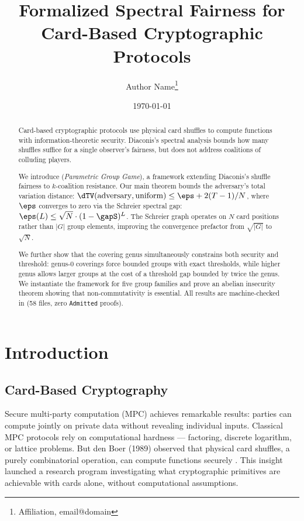 \documentclass[11pt,a4paper]{article}
\title{Formalized Spectral Fairness for Card-Based Cryptographic Protocols}
\author{
  Author Name\footnote{Affiliation, email@domain}
}
\date{\today}
\begin{document}
\maketitle

\begin{abstract}

Card-based cryptographic protocols use physical card shuffles to compute functions with information-theoretic security.
Diaconis's spectral analysis bounds how many shuffles suffice for a single observer's fairness, but does not address coalitions of colluding players.

We introduce \pgg (\textit{Parametric Group Game}), a framework extending Diaconis's shuffle fairness to $k$-coalition resistance.
Our main theorem bounds the adversary's total variation distance: $\dTV(\text{adversary}, \text{uniform}) \leq \eps + 2(T-1)/N$, where $\eps$ converges to zero via the Schreier spectral gap: $\eps(L) \leq \sqrt{N} \cdot (1 - \gapS)^L$.
The Schreier graph operates on $N$ card positions rather than $|G|$ group elements, improving the convergence prefactor from $\sqrt{|G|}$ to $\sqrt{N}$.

We further show that the covering genus simultaneously constrains both security and threshold: genus-0 coverings force bounded groups with exact thresholds, while higher genus allows larger groups at the cost of a threshold gap bounded by twice the genus.
We instantiate the framework for five group families and prove an abelian insecurity theorem showing that non-commutativity is essential.
All results are machine-checked in \Rocq{} (58 files, zero \texttt{Admitted} proofs).

\end{abstract}

\section{Introduction}
\label{sec:intro}

\subsection*{Card-Based Cryptography}

Secure multi-party computation (MPC) achieves remarkable results: parties can compute jointly on private data without revealing individual inputs.
Classical MPC protocols rely on computational hardness — factoring, discrete logarithm, or lattice problems.
But den Boer (1989) observed that physical card shuffles, a purely combinatorial operation, can compute functions securely \cite{denBoer1989}.
This insight launched a research program investigating what cryptographic primitives are achievable with cards alone, without computational assumptions.
\end{document}
